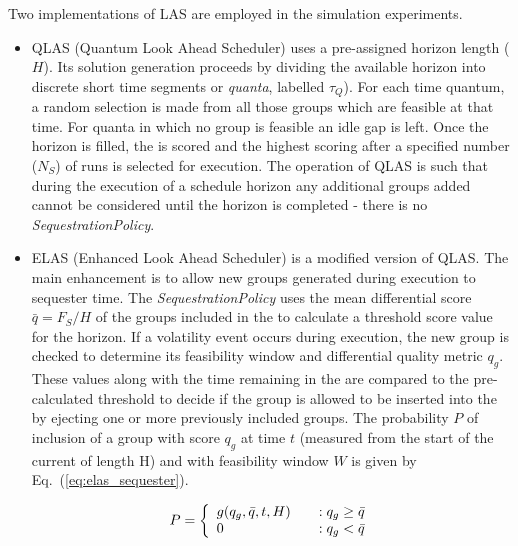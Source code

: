 Two implementations of LAS are employed in the simulation experiments.

\begin{itemize}
\item QLAS (Quantum Look Ahead Scheduler)  uses a pre-assigned horizon length ($H$). Its solution generation proceeds by dividing the available horizon into discrete short time segments or \emph{quanta}, labelled $\tau_Q$). For each time quantum, a random selection is made from all those groups which are feasible at that time. For quanta in which no group is feasible an idle gap is left. Once the horizon is filled, the \echelon is scored and the highest scoring \echelon after a specified number ($N_S$) of runs is selected for execution. The operation of QLAS is such that during the execution of a schedule horizon any additional groups added cannot be considered until the horizon is completed - there is no \emph{SequestrationPolicy}. 

\item ELAS (Enhanced Look Ahead Scheduler)  is a modified version of QLAS. The main enhancement is to allow new groups generated during execution to sequester time. The \emph{SequestrationPolicy} uses the mean differential score $\bar{q} = F_S/H$ of the groups included in the \echelon to calculate a threshold score value for the horizon. If a volatility event occurs during execution, the new group is checked to determine its feasibility window and differential quality metric $q_g$. These values along with the time remaining in the \echelon are compared to the pre-calculated threshold to decide if the group is allowed to be inserted into the \echelon by ejecting one or more previously included groups. The probability $P$ of inclusion of a group with score $q_g$ at time $t$ (measured from the start of the current \echelon of length H) and with feasibility window $W$ is given by Eq.~(\ref{eq:elas_sequester}).

\begin{equation}
\label{eq:elas_sequester}
  P = \left\{
    \begin{array}{l l}
     g(q_g,\bar{q},t,H) & \quad : q_g \geq \bar{q}\\
     0                  & \quad : q_g < \bar{q}\\
    \end{array} \right.
\end{equation}


\end{itemize}

